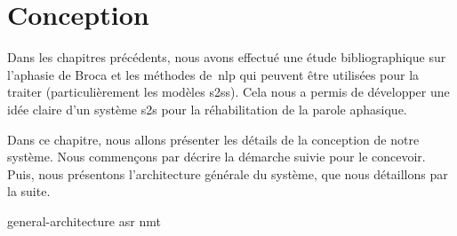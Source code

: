 \chapter{Conception}
\label{chap.conception}

Dans les chapitres précédents, nous avons effectué une étude bibliographique sur l'aphasie de Broca 
et les méthodes de~\gls{nlp} qui peuvent être utilisées pour la traiter 
(particulièrement les modèles \glspl{s2s}).
Cela nous a permis de développer une idée claire d'un système \gls{s2s} pour la réhabilitation de la parole aphasique.

Dans ce chapitre, nous allons présenter les détails de la conception de notre système.
Nous commençons par décrire la démarche suivie pour le concevoir.
Puis, nous présentons l'architecture générale du système, 
que nous détaillons par la suite.

{general-architecture}
{asr}
{nmt}